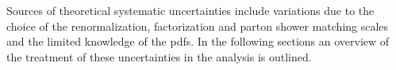 Sources of theoretical systematic uncertainties include variations due to the
choice of the renormalization, factorization and parton shower matching scales
and the limited knowledge of the \glspl{pdf}. In the following sections an
overview of the treatment of these uncertainties in the analysis is outlined.
